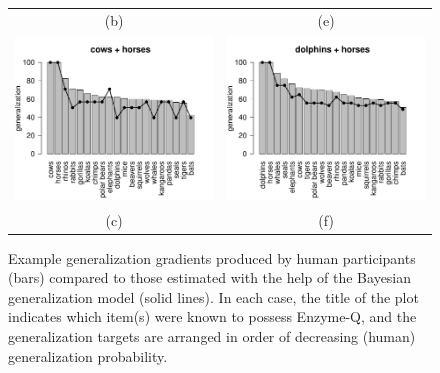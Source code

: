 \begin{figure}[p]
\begin{center}
\begin{tabular}{cc}
	(b) & (e) \\
	\includegraphics[width=6.5cm]{generalization_figs/cowshorses.pdf} &
	\includegraphics[width=6.5cm]{generalization_figs/dolphinshorses.pdf} \\	
	(c) & (f) \\
\end{tabular}
\vspace*{12pt}
\caption{Example generalization gradients produced by human participants (bars) compared to those estimated with the help of the Bayesian generalization model (solid lines). In each case, the title of the plot indicates which item(s) were known to possess Enzyme-Q, and the generalization targets are arranged in order of decreasing (human) generalization probability.}
\label{fig:gen_posterior_pred}
\end{center}
\end{figure}

	

%
%	
%		


